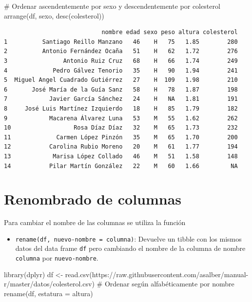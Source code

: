 \documentclass[
  a4paper,
]{scrreport}
\newenvironment{Shaded}{\begin{snugshade}}{\end{snugshade}}
\newcommand{\AttributeTok}[1]{\textcolor[rgb]{0.40,0.45,0.13}{#1}}
\newcommand{\CommentTok}[1]{\textcolor[rgb]{0.37,0.37,0.37}{#1}}
\newcommand{\FunctionTok}[1]{\textcolor[rgb]{0.28,0.35,0.67}{#1}}
\newcommand{\NormalTok}[1]{\textcolor[rgb]{0.00,0.23,0.31}{#1}}
\newcommand{\OtherTok}[1]{\textcolor[rgb]{0.00,0.23,0.31}{#1}}
\newcommand{\StringTok}[1]{\textcolor[rgb]{0.13,0.47,0.30}{#1}}
\providecommand{\tightlist}{%
  \setlength{\itemsep}{0pt}\setlength{\parskip}{0pt}}\usepackage{longtable,booktabs,array}
\theoremstyle{definition}
\theoremstyle{definition}
\theoremstyle{remark}
\begin{document}
\begin{Shaded}
\begin{Highlighting}[]
\CommentTok{\# Ordenar ascendentemente por sexo y descendentemente por colesterol}
\FunctionTok{arrange}\NormalTok{(df, sexo, }\FunctionTok{desc}\NormalTok{(colesterol))}
\end{Highlighting}
\end{Shaded}

\begin{verbatim}
                            nombre edad sexo peso altura colesterol
1          Santiago Reillo Manzano   46    H   75   1.85        280
2          Antonio Fernández Ocaña   51    H   62   1.72        276
3                Antonio Ruiz Cruz   68    H   66   1.74        249
4             Pedro Gálvez Tenorio   35    H   90   1.94        241
5  Miguel Angel Cuadrado Gutiérrez   27    H  109   1.98        210
6       José María de la Guía Sanz   58    H   78   1.87        198
7            Javier García Sánchez   24    H   NA   1.81        191
8     José Luis Martínez Izquierdo   18    H   85   1.79        182
9            Macarena Álvarez Luna   53    M   55   1.62        262
10                  Rosa Díaz Díaz   32    M   65   1.73        232
11             Carmen López Pinzón   35    M   65   1.70        200
12           Carolina Rubio Moreno   20    M   61   1.77        194
13            Marisa López Collado   46    M   51   1.58        148
14           Pilar Martín González   22    M   60   1.66         NA
\end{verbatim}

\hypertarget{renombrado-de-columnas}{%
\section{Renombrado de columnas}\label{renombrado-de-columnas}}

Para cambiar el nombre de las columnas se utiliza la función

\begin{itemize}
\tightlist
\item
  \texttt{rename(df,\ nuevo-nombre\ =\ columna)}: Devuelve un tibble con
  los mismos datos del data frame \texttt{df} pero cambiando el nombre
  de la columna de nombre \texttt{columna} por \texttt{nuevo-nombre}.
\end{itemize}

\begin{Shaded}
\begin{Highlighting}[]
\FunctionTok{library}\NormalTok{(dplyr)}
\NormalTok{df }\OtherTok{\textless{}{-}} \FunctionTok{read.csv}\NormalTok{(}\StringTok{\textquotesingle{}https://raw.githubusercontent.com/asalber/manual{-}r/master/datos/colesterol.csv\textquotesingle{}}\NormalTok{)}
\CommentTok{\# Ordenar según alfabéticamente por nombre}
\FunctionTok{rename}\NormalTok{(df, }\AttributeTok{estatura =}\NormalTok{ altura)}
\end{Highlighting}
\end{Shaded}
\end{document}
